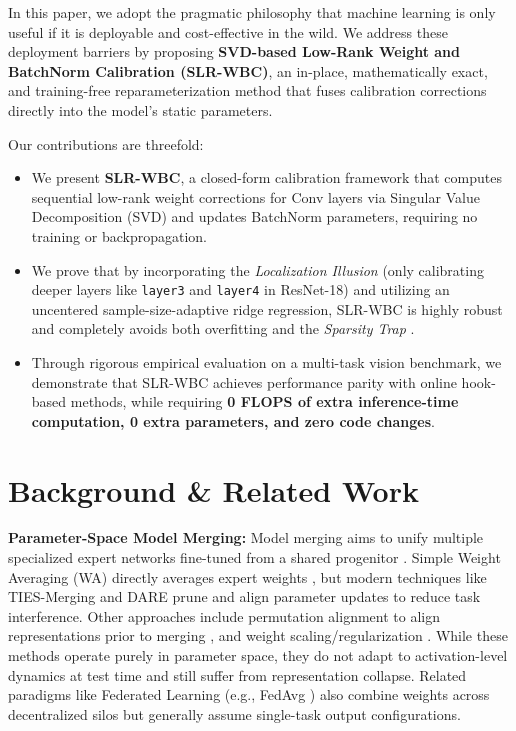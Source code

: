 \documentclass{article}
\theoremstyle{plain}
\theoremstyle{definition}
\theoremstyle{remark}
\begin{document}
In this paper, we adopt the pragmatic philosophy that machine learning is only useful if it is deployable and cost-effective in the wild. We address these deployment barriers by proposing \textbf{SVD-based Low-Rank Weight and BatchNorm Calibration (SLR-WBC)}, an in-place, mathematically exact, and training-free reparameterization method that fuses calibration corrections directly into the model's static parameters. 

Our contributions are threefold:
\begin{itemize}
  \item We present \textbf{SLR-WBC}, a closed-form calibration framework that computes sequential low-rank weight corrections for Conv layers via Singular Value Decomposition (SVD) and updates BatchNorm parameters, requiring no training or backpropagation.
  \item We prove that by incorporating the \textit{Localization Illusion} (only calibrating deeper layers like \texttt{layer3} and \texttt{layer4} in ResNet-18) and utilizing an uncentered sample-size-adaptive ridge regression, SLR-WBC is highly robust and completely avoids both overfitting and the \textit{Sparsity Trap} \cite{tcac2024}.
  \item Through rigorous empirical evaluation on a multi-task vision benchmark, we demonstrate that SLR-WBC achieves performance parity with online hook-based methods, while requiring \textbf{0 FLOPS of extra inference-time computation, 0 extra parameters, and zero code changes}.
\end{itemize}

\section{Background \& Related Work}
\label{sec:related}
\textbf{Parameter-Space Model Merging:} Model merging aims to unify multiple specialized expert networks fine-tuned from a shared progenitor \cite{choshen2022fusing, tang2023fusion, akiba2024evolutionary}. Simple Weight Averaging (WA) directly averages expert weights \cite{wortsman2022modelsoups}, but modern techniques like TIES-Merging \cite{yadav2023ties} and DARE \cite{yu2023dare} prune and align parameter updates to reduce task interference. Other approaches include permutation alignment to align representations prior to merging \cite{ainsworth2022git, stoica2023zipit}, and weight scaling/regularization \cite{jin2023regmean, matena2022merging}. While these methods operate purely in parameter space, they do not adapt to activation-level dynamics at test time and still suffer from representation collapse. Related paradigms like Federated Learning (e.g., FedAvg \cite{mcmahan2017fedavg}) also combine weights across decentralized silos but generally assume single-task output configurations.
\end{document}
